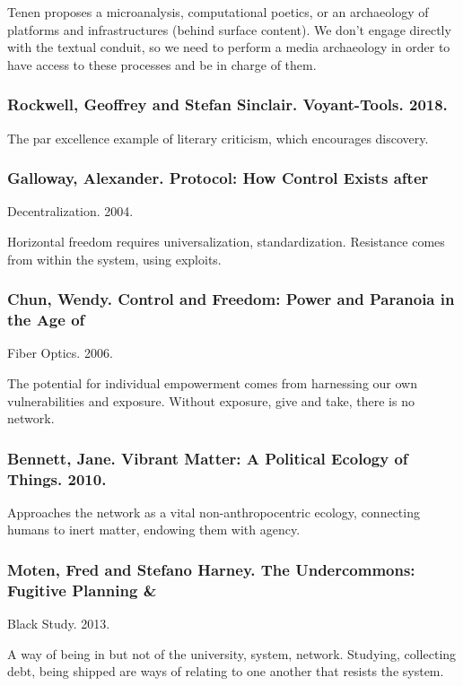 \documentclass[11pt]{article}
\begin{document}
Tenen proposes a microanalysis, computational poetics, or an
archaeology of platforms and infrastructures (behind surface
content). We don’t engage directly with the textual conduit, so we
need to perform a media archaeology in order to have access to these
processes and be in charge of them.

\subsubsection{Rockwell, Geoffrey and Stefan Sinclair. Voyant-Tools. 2018.}
\label{sec:org0cae242}

The par excellence example of literary criticism, which encourages
discovery.

\subsubsection{Galloway, Alexander. Protocol: How Control Exists after}
\label{sec:org485ef4b}
Decentralization. 2004.

Horizontal freedom requires universalization,
standardization. Resistance comes from within the system, using
exploits.

\subsubsection{Chun, Wendy. Control and Freedom: Power and Paranoia in the Age of}
\label{sec:org8cdb564}
Fiber Optics. 2006.

The potential for individual empowerment comes from harnessing our own
vulnerabilities and exposure. Without exposure, give and take, there
is no network.

\subsubsection{Bennett, Jane. Vibrant Matter: A Political Ecology of Things. 2010.}
\label{sec:org4bb69bd}

Approaches the network as a vital non-anthropocentric ecology,
connecting humans to inert matter, endowing them with agency.

\subsubsection{Moten, Fred and Stefano Harney. The Undercommons: Fugitive Planning \&}
\label{sec:org332e586}
Black Study. 2013.

A way of being in but not of the university, system,
network. Studying, collecting debt, being shipped are ways of relating
to one another that resists the system.
\end{document}
